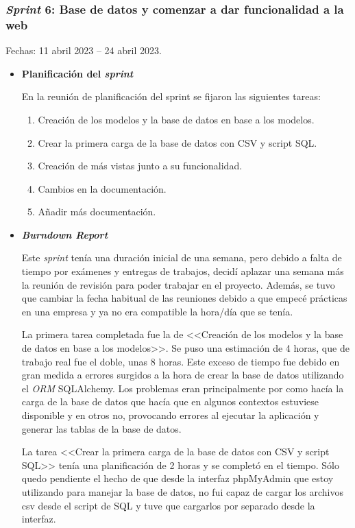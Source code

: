 \subsubsection{\textit{Sprint} 6: Base de datos y comenzar a dar funcionalidad a la web}
Fechas: 11 abril 2023 -- 24 abril 2023.
\begin{itemize}
\item\textbf{Planificación del \textit{sprint}}

En la reunión de planificación del sprint se fijaron las siguientes tareas:
\begin{enumerate}
		\item Creación de los modelos y la base de datos en base a los modelos.
		\item Crear la primera carga de la base de datos con CSV y script SQL.
		\item Creación de más vistas junto a su funcionalidad.
		\item Cambios en la documentación.
		\item Añadir más documentación.
\end{enumerate}

\item\textbf{\textit{Burndown Report}}

Este \textit{sprint} tenía una duración inicial de una semana, pero debido a falta de tiempo por exámenes y entregas de trabajos, decidí aplazar una semana más la reunión de revisión para poder trabajar en el proyecto. 
Además, se tuvo que cambiar la fecha habitual de las reuniones debido a que empecé prácticas en una empresa y ya no era compatible la hora/día que se tenía.

La primera tarea completada fue la de <<Creación de los modelos y la base de datos en base a los modelos>>. 
Se puso una estimación de 4 horas, que de trabajo real fue el doble, unas 8 horas. 
Este exceso de tiempo fue debido en gran medida a errores surgidos a la hora de crear la base de datos utilizando el \textit{ORM} SQLAlchemy. 
Los problemas eran principalmente por como hacía la carga de la base de datos que hacía que en algunos contextos estuviese disponible y en otros no, provocando errores al ejecutar la aplicación y generar las tablas de la base de datos.

La tarea <<Crear la primera carga de la base de datos con CSV y script SQL>> tenía una planificación de 2 horas y se completó en el tiempo. 
Sólo quedo pendiente el hecho de que desde la interfaz phpMyAdmin que estoy utilizando para manejar la base de datos, no fui capaz de cargar los archivos csv desde el script de SQL y tuve que cargarlos por separado desde la interfaz.


\end{itemize}
